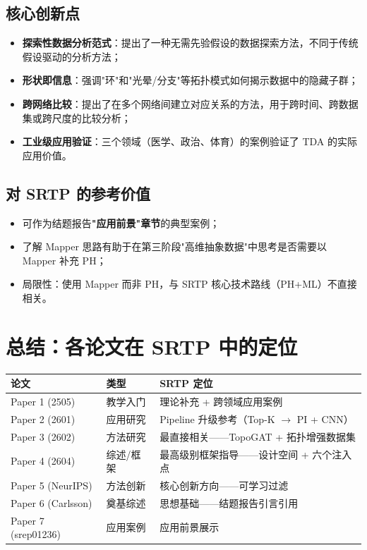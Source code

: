 \documentclass[11pt,a4paper]{article}
\begin{document}
\subsection*{核心创新点}
\begin{itemize}[nosep]
  \item \textbf{探索性数据分析范式}：提出了一种无需先验假设的数据探索方法，不同于传统假设驱动的分析方法；
  \item \textbf{形状即信息}：强调"环"和"光晕/分支"等拓扑模式如何揭示数据中的隐藏子群；
  \item \textbf{跨网络比较}：提出了在多个网络间建立对应关系的方法，用于跨时间、跨数据集或跨尺度的比较分析；
  \item \textbf{工业级应用验证}：三个领域（医学、政治、体育）的案例验证了 TDA 的实际应用价值。
\end{itemize}

\subsection*{对 SRTP 的参考价值}
\begin{itemize}[nosep]
  \item 可作为结题报告\textbf{"应用前景"章节}的典型案例；
  \item 了解 Mapper 思路有助于在第三阶段"高维抽象数据"中思考是否需要以 Mapper 补充 PH；
  \item 局限性：使用 Mapper 而非 PH，与 SRTP 核心技术路线（PH+ML）不直接相关。
\end{itemize}


\section*{总结：各论文在 SRTP 中的定位}

\begin{center}
\renewcommand{\arraystretch}{1.3}
\begin{tabular}{p{2.5cm}p{4cm}p{4.5cm}}
\toprule
\textbf{论文} & \textbf{类型} & \textbf{SRTP 定位} \\
\midrule
Paper 1 (2505) & 教学入门 & 理论补充 + 跨领域应用案例 \\
Paper 2 (2601) & 应用研究 & Pipeline 升级参考（Top-K $\to$ PI + CNN） \\
Paper 3 (2602) & 方法研究 & 最直接相关——TopoGAT + 拓扑增强数据集 \\
Paper 4 (2604) & 综述/框架 & 最高级别框架指导——设计空间 + 六个注入点 \\
Paper 5 (NeurIPS) & 方法创新 & 核心创新方向——可学习过滤 \\
Paper 6 (Carlsson) & 奠基综述 & 思想基础——结题报告引言引用 \\
Paper 7 (srep01236) & 应用案例 & 应用前景展示 \\
\bottomrule
\end{tabular}
\end{center}
\end{document}
